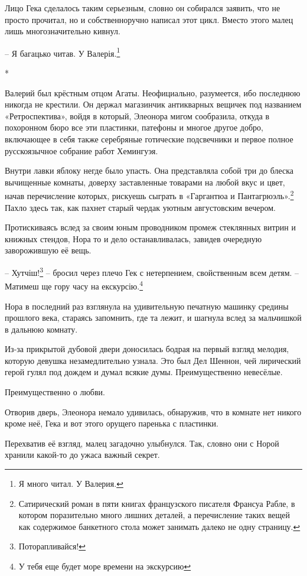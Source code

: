 \documentclass[
  a5paperpaper,
  DIV=11,
  numbers=noendperiod]{scrreprt}
\begin{document}
Лицо Гека сделалось таким серьезным, словно он собирался заявить, что не
просто прочитал, но и собственноручно написал этот цикл. Вместо этого
малец лишь многозначительно кивнул.

-- Я багацько читав. У Валерія.\footnote{Я много читал. У Валерия.}

*

Валерий был крёстным отцом Агаты. Неофициально, разумеется, ибо
последнюю никогда не крестили. Он держал магазинчик антикварных вещичек
под названием «Ретроспектива», войдя в который, Элеонора мигом
сообразила, откуда в похоронном бюро все эти пластинки, патефоны и
многое другое добро, включающее в себя также серебряные готические
подсвечники и первое полное русскоязычное собрание работ Хемингуэя.

Внутри лавки яблоку негде было упасть. Она представляла собой три до
блеска вычищенные комнаты, доверху заставленные товарами на любой вкус и
цвет, начав перечисление которых, рискуешь сыграть в «Гаргантюа и
Пантагрюэль».\footnote{Сатирический роман в пяти книгах французского
  писателя Франсуа Рабле, в котором поразительно много лишних деталей, а
  перечисление таких вещей как содержимое банкетного стола может
  занимать далеко не одну страницу.} Пахло здесь так, как пахнет старый
чердак уютным августовским вечером.

Протискиваясь вслед за своим юным проводником промеж стеклянных витрин и
книжных стендов, Нора то и дело останавливалась, завидев очередную
заворожившую её вещь.

-- Хутчіш!\footnote{Поторапливайся!} -- бросил через плечо Гек с
нетерпением, свойственным всем детям. -- Матимеш ще гору часу на
екскурсію.\footnote{У тебя еще будет море времени на экскурсию}

Нора в последний раз взглянула на удивительную печатную машинку средины
прошлого века, стараясь запомнить, где та лежит, и шагнула вслед за
мальчишкой в дальнюю комнату.

Из-за прикрытой дубовой двери доносилась бодрая на первый взгляд
мелодия, которую девушка незамедлительно узнала. Это был Дел Шеннон, чей
лирический герой гулял под дождем и думал всякие думы. Преимущественно
невесёлые.

Преимущественно о любви.

Отворив дверь, Элеонора немало удивилась, обнаружив, что в комнате нет
никого кроме неё, Гека и вот этого орущего паренька с пластинки.

Перехватив её взгляд, малец загадочно улыбнулся. Так, словно они с Норой
хранили какой-то до ужаса важный секрет.
\end{document}
